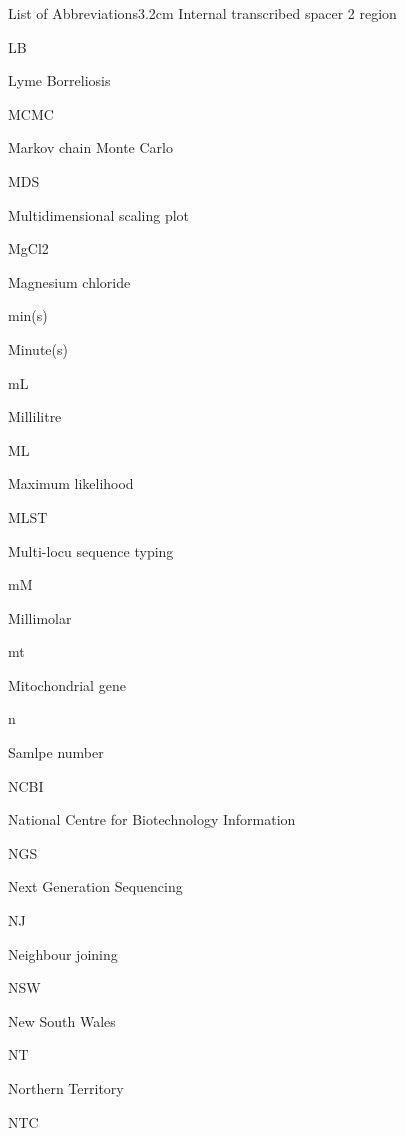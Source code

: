 \documentclass[a4paper, nobind]{templates/ociamthesis}
\begin{document}
\begin{romanpages}
\begin{mclistof}{List of Abbreviations}{3.2cm}
Internal transcribed spacer 2 region

\item[LB]

Lyme Borreliosis

\item[MCMC]

Markov chain Monte Carlo

\item[MDS]

Multidimensional scaling plot

\item[MgCl2]

Magnesium chloride

\item[min(s)]

Minute(s)

\item[mL]

Millilitre

\item[ML]

Maximum likelihood

\item[MLST]

Multi-locu sequence typing

\item[mM]

Millimolar

\item[mt]

Mitochondrial gene

\item[n]

Samlpe number

\item[NCBI]

National Centre for Biotechnology Information

\item[NGS]

Next Generation Sequencing

\item[NJ]

Neighbour joining

\item[NSW]

New South Wales

\item[NT]

Northern Territory

\item[NTC]


\end{mclistof}
\end{romanpages}
\end{document}
